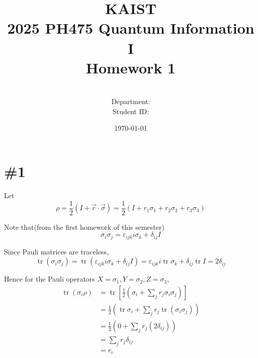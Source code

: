 \documentclass[a4paper,11pt]{article}
\title{KAIST\\2025 PH475 Quantum Information I\\
Homework 1\bigskip}
\author{\textbf{\Large \name} \\
Department: \department\\
Student ID: \studentid}
\date{\today}
\begin{document}
\thispagestyle{empty}
\maketitle
\tableofcontents
{}

\newcommand{\der}[2][]{\frac{d #1}{d #2}}
\newcommand{\pder}[2][]{\frac{\partial #1}{\partial #2}}
\newcommand{\grad}{\operatorname{grad}}
\newcommand{\diver}{\operatorname{div}}
\newcommand{\curl}{\operatorname{curl}}
\newcommand{\tr}{\operatorname{tr}}

\newcommand{\cnot}{C_{\text{NOT}}}
\newcommand{\cz}{C_{Z}}

\section{\#1}


Let 
\begin{equation}
    \rho=\frac{1}{2}\left(I+\vec r\cdot\vec\sigma\right)=\frac{1}{2}\left(I + r_1\sigma_1+r_2\sigma_2+r_3\sigma_3\right)
\end{equation}

Note that(from the first homework of this semester)
\begin{equation}
    \sigma_i\sigma_j=\varepsilon_{ijk} i\sigma_k + \delta_{ij}I
\end{equation}

Since Pauli matrices are traceless, 
\begin{equation}
    \tr(\sigma_i\sigma_j) = \tr(\varepsilon_{ijk} i\sigma_k + \delta_{ij}I) = \varepsilon_{ijk} i\tr \sigma_k + \delta_{ij}\tr I = 2\delta_{ij}
\end{equation}

Hence for the Pauli operators $X=\sigma_1, Y=\sigma_2, Z=\sigma_3$,
\begin{align}
    \tr(\sigma_i\rho) 
    &= \tr\left[\frac{1}{2}\left(\sigma_i+\sum_jr_j\sigma_i\sigma_j\right)\right]\\
    &=\frac{1}{2}\left(\tr\sigma_i+\sum_jr_j\tr(\sigma_i\sigma_j)\right)\\
    &=\frac{1}{2}\left(0+\sum_jr_j(2\delta_{ij})\right)\\
    &=\sum_{j}r_j\delta_{ij}\\
    &=r_i
\end{align}
\end{document}
